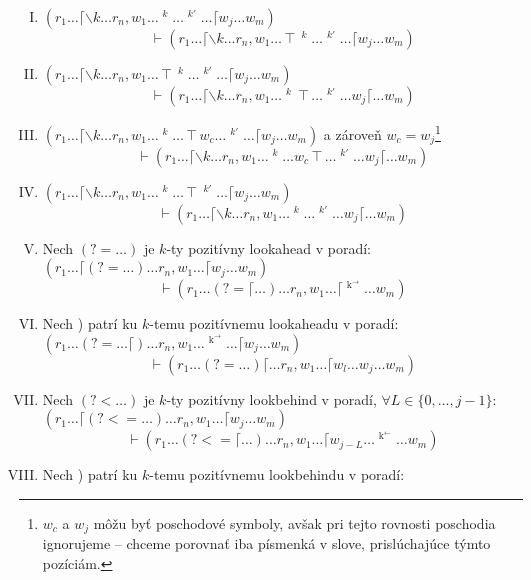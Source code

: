 \begin{df}
\begin{enumerate}[I.]
\item $\displaystyle{(r_1 \dots \lceil \backslash k \dots r_n,w_1\dots\mathop{w_a}^k\dots\mathop{w_b}^{k'}\dots \lceil w_j\dots w_m)}$
$$\vdash(r_1 \dots \lceil \backslash k \dots r_n,w_1\dots\intercal\mathop{w_a}^k \dots \mathop{w_b}^{k'} \dots \lceil w_j\dots w_m)$$	
\item $\displaystyle{(r_1 \dots \lceil \backslash k \dots r_n,w_1\dots\intercal\mathop{w_a}^k \dots \mathop{w_b}^{k'} \dots \lceil w_j\dots w_m)}$
$$\vdash(r_1 \dots \lceil \backslash k \dots r_n,w_1\dots\mathop{w_a}^k\intercal \dots \mathop{w_b}^{k'} \dots w_j\lceil\dots w_m)$$
\item $\displaystyle{(r_1 \dots \lceil \backslash k \dots r_n,w_1\dots\mathop{w_a}^k\dots \intercal w_c \dots \mathop{w_b}^{k'} \dots \lceil w_j\dots w_m)}$ a zároveň $w_c = w_j$\footnote{$w_c$ a $w_j$ môžu byť poschodové symboly, avšak pri tejto rovnosti poschodia ignorujeme -- chceme porovnať iba písmenká v slove, prislúchajúce týmto pozíciám.}
$$\vdash(r_1 \dots \lceil \backslash k \dots r_n,w_1\dots\mathop{w_a}^k\dots w_c\intercal \dots \mathop{w_b}^{k'} \dots  w_j\lceil\dots w_m)$$
\item $\displaystyle{(r_1 \dots \lceil \backslash k \dots r_n,w_1\dots\mathop{w_a}^k\dots \intercal  \mathop{w_b}^{k'} \dots \lceil w_j\dots w_m)}$
$$\vdash(r_1 \dots \lceil \backslash k \dots r_n,w_1\dots\mathop{w_a}^k\dots \mathop{w_b}^{k'} \dots  w_j\lceil\dots w_m)$$
\item Nech $(?=\dots)$ je $k$-ty pozitívny lookahead v poradí: 
\\$\displaystyle{(r_1\dots \lceil (?=\dots) \dots r_n, w_1\dots\lceil w_j\dots w_m )}$
$$ \vdash(r_1\dots (?=\lceil\dots) \dots r_n, w_1\dots\lceil \mathop{w_j}^{\mathop{k}^\rightarrow}\dots w_m ) $$
\item Nech ) patrí ku $k$-temu pozitívnemu lookaheadu v poradí: 
\\$\displaystyle{(r_1\dots (?=\dots\lceil) \dots r_n, w_1\dots \mathop{w_l}^{\mathop{k}^\rightarrow}\dots\lceil w_j\dots w_m )} $
$$ \vdash(r_1\dots (?=\dots)\lceil \dots r_n, w_1\dots \lceil w_l \dots w_j\dots w_m ) $$
\item Nech $(?<\dots)$ je $k$-ty pozitívny lookbehind v poradí, $\forall L\in\lbrace 0,\dots, j-1\rbrace$:
$\displaystyle{(r_1\dots \lceil (?<=\dots) \dots r_n, w_1\dots\lceil w_j\dots w_m )}$
$$ \vdash (r_1\dots (?<=\lceil\dots) \dots r_n, w_1\dots\lceil w_{j-L}\dots \mathop{w_j}^{\mathop{k}^\leftarrow} \dots w_m ) $$
\item Nech ) patrí ku $k$-temu pozitívnemu lookbehindu v poradí:

\end{enumerate}
\end{df}
